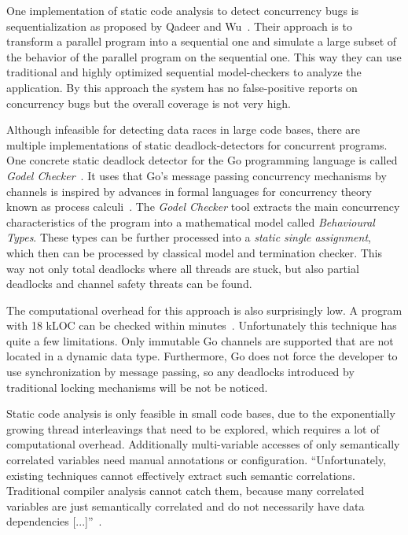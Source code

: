 \documentclass[english]{lni}
\begin{document}
One implementation of static code analysis to detect concurrency bugs is sequentialization as proposed by Qadeer and Wu~\cite{qadeer2004kiss}.
Their approach is to transform a parallel program into a sequential one and simulate a large subset of the behavior of the parallel program on the sequential one.
This way they can use traditional and highly optimized sequential model-checkers to analyze the application.
By this approach the system has no false-positive reports on concurrency bugs but the overall coverage is not very high.

Although infeasible for detecting data races in large code bases, there are multiple implementations of static deadlock-detectors for concurrent programs.
One concrete static deadlock detector for the Go programming language is called \emph{Godel Checker}~\cite{godelChecker}.
It uses that Go's message passing concurrency mechanisms by channels is inspired by advances in formal languages for concurrency theory known as process calculi~\cite{lange2018verification}.
The \emph{Godel Checker} tool extracts the main concurrency characteristics of the program into a mathematical model called \emph{Behavioural Types}.
These types can be further processed into a \emph{static single assignment}, which then can be processed by classical model and termination checker.
This way not only total deadlocks where all threads are stuck, but also partial deadlocks and channel safety threats can be found.

The computational overhead for this approach is also surprisingly low.
A program with 18 kLOC can be checked within minutes~\cite{lange2018verification}.
Unfortunately this technique has quite a few limitations.
Only immutable Go channels are supported that are not located in a dynamic data type.
Furthermore, Go does not force the developer to use synchronization by message passing, so any deadlocks introduced by traditional locking mechanisms will be not be noticed.

Static code analysis is only feasible in small code bases, due to the exponentially growing thread interleavings that need to be explored, which requires a lot of computational overhead.
Additionally multi-variable accesses of only semantically correlated variables need manual annotations or configuration.
``Unfortunately, existing techniques cannot effectively extract such semantic correlations. Traditional compiler analysis cannot catch them, because many correlated variables are just semantically correlated and do not necessarily have data dependencies [...]''~\cite{lu2007muvi}.
\end{document}
